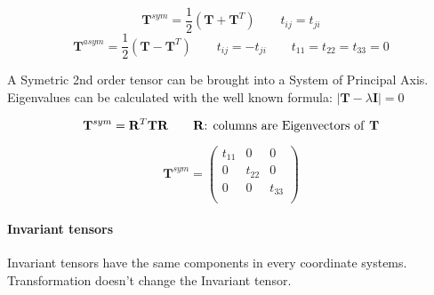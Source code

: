 			$$	\mathbf{T}^{sym}=\frac{1}{2}\left(\mathbf{T}+\mathbf{T}^T\right) \qquad t_{ij} = t_{ji}$$
			$$	\mathbf{T}^{asym}=\frac{1}{2}\left(\mathbf{T}-\mathbf{T}^T\right) \qquad t_{ij} = -t_{ji} \qquad t_{11} = t_{22} = t_{33} = 0$$

		A Symetric 2nd order tensor can be brought into a System of Principal Axis. Eigenvalues can be calculated with the well known formula: $|\mathbf{T}-\lambda \mathbf{I}| = 0$
		
		$$ \mathbf{T}^{sym} = \mathbf{R}^T \mathbf{T} \mathbf{R} \qquad \mathbf{R}\text{: columns are Eigenvectors of \textbf{T}}$$ 		
		
		$$ \mathbf{T}^{sym} = \begin{pmatrix}
		t_{11} & 0 & 0 \\ 0 & t_{22} & 0 \\ 0 & 0 & t_{33} \\
		\end{pmatrix}$$

		
		
	\paragraph{Invariant tensors} Invariant tensors have the same components in every coordinate systems. Transformation doesn't change the Invariant tensor.
	

